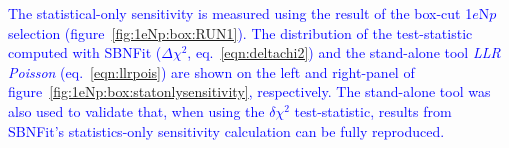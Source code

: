 \documentclass[a4paper]{article}
\begin{document}
\textcolor{blue}{The statistical-only sensitivity is measured using the result of the box-cut 1$e$N$p$ selection (figure~\ref{fig:1eNp:box:RUN1}). The distribution of the test-statistic computed with SBNFit ($\Delta\chi^2$, eq.~\ref{eqn:deltachi2}) and the stand-alone tool \emph{LLR Poisson} (eq.~\ref{eqn:llrpois}) are shown on the left and right-panel of figure~\ref{fig:1eNp:box:statonlysensitivity}, respectively. The stand-alone tool was also used to validate that, when using the $\delta\chi^2$ test-statistic, results from SBNFit's statistics-only sensitivity calculation can be fully reproduced.}

{}
\end{document}
